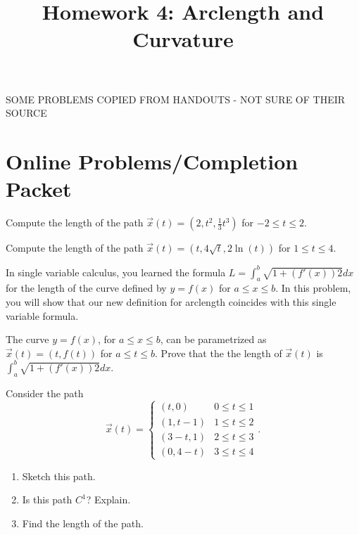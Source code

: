 \documentclass{ximera}
\title{Homework 4: Arclength and Curvature}
\begin{document}
\begin{abstract}
\end{abstract}
\maketitle

SOME PROBLEMS COPIED FROM HANDOUTS - NOT SURE OF THEIR SOURCE

\section*{Online Problems/Completion Packet}

\begin{problem}
Compute the length of the path $\vec{x}(t)=\left(2,t^2,\frac{1}{3}t^3\right)$ for $-2\leq t\leq 2$.
\end{problem}

\begin{problem}
Compute the length of the path $\vec{x}(t) = \left(t, 4\sqrt{t}, 2\ln(t)\right)$ for $1\leq t\leq 4$.
\end{problem}

\begin{problem}
In single variable calculus, you learned the formula $L=\int_a^b\sqrt{1+(f'(x))2}dx$ for the length of the curve defined by $y=f(x)$ for $a\leq x\leq b$. In this problem, you will show that our new definition for arclength coincides with this single variable formula.

The curve $y=f(x)$, for $a\leq x\leq b$, can be parametrized as $\vec{x}(t) = (t,f(t))$ for $a\leq t\leq b$. Prove that the the length of $\vec{x}(t)$ is $\int_a^b\sqrt{1+(f'(x))2}dx$.
\end{problem}

\begin{problem}
Consider the path
\[
\vec{x}(t) = \begin{cases}
(t,0) & 0\leq t\leq 1\\
(1,t-1) & 1\leq t\leq 2\\
(3-t, 1) & 2\leq t\leq 3\\
(0, 4-t) & 3\leq t\leq 4
\end{cases}.
\]
\begin{enumerate}
\item Sketch this path.
\item Is this path $C^1$? Explain.
\item Find the length of the path.
\end{enumerate}
\end{problem}
\end{document}
